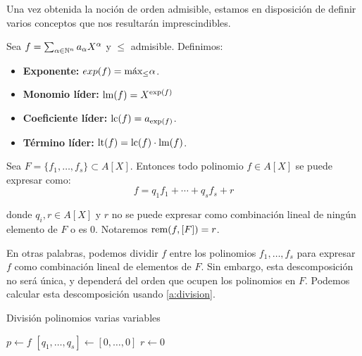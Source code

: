 Una vez obtenida la noción de orden admisible, estamos en disposición de definir varios conceptos que nos resultarán imprescindibles.

\begin{definicion}
    Sea $f= \sum_{\alpha\in \Nn} a_{\alpha} X^{\alpha}$ y $\le$ admisible. Definimos:
    \begin{itemize}
        \item \textbf{Exponente:} $exp(f) = \Max_{\le}\alpha$.
        \item \textbf{Monomio líder:} $\lmf = X^{\expf}$
        \item \textbf{Coeficiente líder:} $\lcf = a_{\expf}$.
        \item \textbf{Término líder:} $\ltf = \lcf \cdot \lmf$.
    \end{itemize}
\end{definicion}

\begin{teorema}
    Sea $F=\{f_1,\dots, f_s\} \subset A[X]$. Entonces todo polinomio $f\in A[X]$ se puede expresar como:
    \begin{equation*}
        f = q_1f_1 + \cdots + q_sf_s + r
    \end{equation*}

    donde $q_i, r\in A[X]$ y $r$ no se puede expresar como combinación lineal de ningún elemento de $F$ o es $0$. Notaremos $\rem(f, [F]) = r$.
\end{teorema}

En otras palabras, podemos dividir $f$ entre los polinomios $f_1, \dots, f_s$ para expresar $f$ como combinación lineal de elementos de $F$. Sin embargo, esta descomposición no será única, y dependerá del orden que ocupen los polinomios en $F$. Podemos calcular esta descomposición usando \autoref{a:division}.

\begin{algorithm}[hbt!]
    \caption{División polinomios varias variables}\label{a:division}
    $p\gets f$\;
    $\left[q_1,\dots, q_s\right] \gets \left[0,\dots, 0\right]$\;
    $r\gets 0$\;

\end{algorithm}

